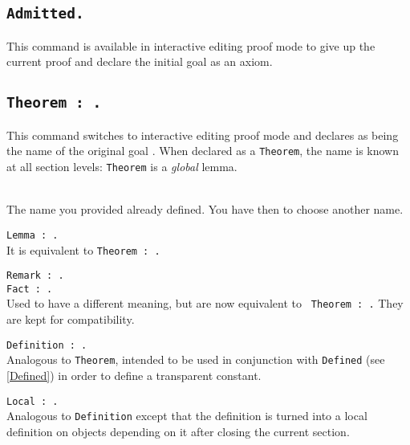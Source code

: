 \subsection{\tt Admitted.}\label{Admitted}
This command is available in interactive editing proof mode to give up
the current proof and declare the initial goal as an axiom.

\subsection{\tt Theorem {\ident} : {\form}.}\label{Theorem}
This command switches to interactive editing proof mode and declares
{\ident} as being the name of the original goal {\form}. When declared
as a {\tt Theorem}, the name {\ident} is known at all section levels:
{\tt Theorem} is a {\sl global} lemma.

\begin{ErrMsgs}
\item {}
\item \ident\ \\ 
  The name you provided already defined. You have then to choose
  another name.
\end{ErrMsgs}


\begin{Variants}
\item {\tt Lemma {\ident} : {\form}.}\\
  It is equivalent to {\tt Theorem {\ident} : {\form}.}
\item {\tt Remark {\ident} : {\form}.}\\
  {\tt Fact {\ident} : {\form}.}\\
  Used to have a different meaning, but are now equivalent to {\tt
  Theorem {\ident} : {\form}.} They are kept for compatibility.
\item {\tt Definition {\ident} : {\form}.}
\\
  Analogous to {\tt Theorem}, intended to be used in conjunction with
  {\tt Defined} (see \ref{Defined}) in order to define a
  transparent constant.
\item {\tt Local {\ident} : {\form}.}
\\
  Analogous to {\tt Definition} except that the definition is turned
  into a local definition on objects depending on it after closing the
  current section.
\end{Variants}

